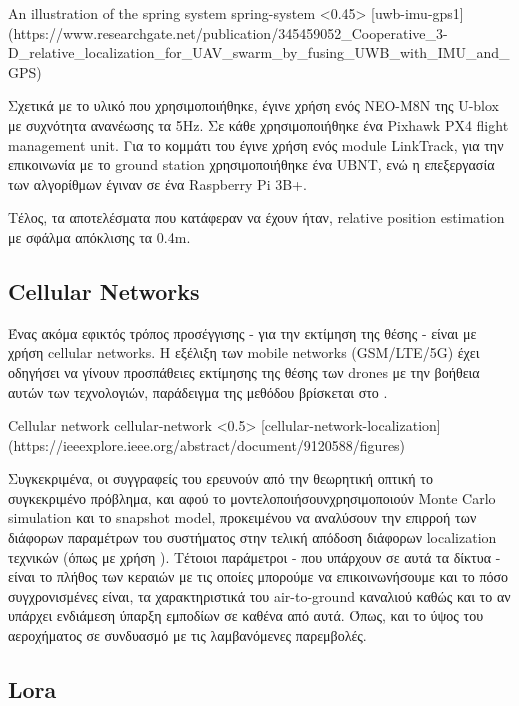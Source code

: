 {An illustration of the spring system}%
{spring-system}%
<0.45>%
[uwb-imu-gps1]%
(https://www.researchgate.net/publication/345459052_Cooperative_3-D_relative_localization_for_UAV_swarm_by_fusing_UWB_with_IMU_and_GPS)

Σχετικά με το υλικό που χρησιμοποιήθηκε, έγινε χρήση ενός NEO-M8N  της U-blox με συχνότητα ανανέωσης τα 5Hz.  
Σε κάθε  χρησιμοποιήθηκε ένα Pixhawk PX4 flight management unit. Για το κομμάτι του  έγινε χρήση
ενός module LinkTrack, για την επικοινωνία με το ground station χρησιμοποιήθηκε ένα UBNT, ενώ η επεξεργασία των 
αλγορίθμων έγιναν σε ένα Raspberry Pi 3B+. 

Τέλος, τα αποτελέσματα που κατάφεραν να έχουν ήταν,  relative position estimation με σφάλμα απόκλισης τα 0.4m. 

\subsection{Cellular Networks}
Ένας ακόμα εφικτός τρόπος προσέγγισης - για την εκτίμηση της θέσης - είναι με χρήση
cellular networks. Η εξέλιξη των mobile networks (GSM/LTE/5G) έχει οδηγήσει να γίνουν προσπάθειες εκτίμησης
της θέσης των drones με την βοήθεια αυτών των τεχνολογιών, παράδειγμα της μεθόδου βρίσκεται στο . 

{Cellular network}%
{cellular-network}%
<0.5>%
[cellular-network-localization]%
(https://ieeexplore.ieee.org/abstract/document/9120588/figures)

Συγκεκριμένα, οι συγγραφείς του \cite{cellular-network-localization} ερευνούν από την θεωρητική οπτική το συ\-γκε\-κρι\-μένο πρόβλημα, 
και αφού το μοντελοποιήσουν\udot χρησιμοποιούν Monte Carlo simulation και το snapshot model, προκειμένου να αναλύσουν την επιρροή 
των διάφορων παραμέτρων του συστήματος στην τελική απόδοση διάφορων localization τεχνικών (όπως με χρήση ). Τέτοιοι 
παράμετροι - που υπάρχουν σε αυτά τα δίκτυα - είναι το πλήθος των κεραιών με τις οποίες μπορούμε να επικοινωνήσουμε και το πόσο συγχρονισμένες 
είναι, τα χαρακτηριστικά του air-to-ground καναλιού καθώς και το αν υπάρχει ενδιάμεση ύπαρξη εμποδίων σε καθένα από αυτά. Όπως, και το 
ύψος του αεροχήματος σε συνδυασμό με τις λαμβανόμενες παρεμβολές.

\subsection{Lora}


